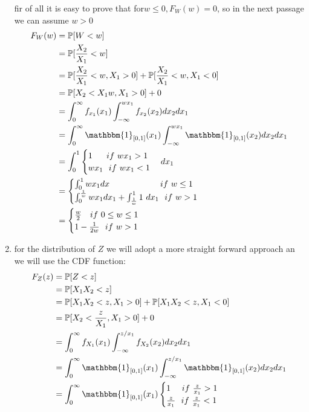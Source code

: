 \begin{ex}
\begin{enumerate}
		fir of all it is easy to prove that for$w\leq 0,F_W(w)=0$, so in the next passage we can assume $w>0$ 
		\[
		\begin{split}
		F_W(w)
		&=\p [W<w]\\
		&=\p[\frac{X_2}{X_1}<w]\\
		&=\p[\frac{X_2}{X_1}<w,X_1>0]+\p[\frac{X_2}{X_1}<w,X_1<0]\\
		&=\p[X_2<X_1w,X_1>0]+0\\
		&=\int_{0}^{\infty}f_{x_1}(x_1)\int_{-\infty}^{wx_1}f_{x_2}(x_2)dx_2dx_1\\
		&=\int_{0}^{\infty}\mathbbm{1}_{[0,1]}(x_1)\int_{-\infty}^{wx_1}\mathbbm{1}_{[0,1]}(x_2)dx_2dx_1\\
		&=\int_{0}^{1}	\begin{cases}
		1 \ \ \ \ \  if \ wx_1>1 \\
		wx_1 \ \  if \  wx_1<1
		\end{cases}dx_1\\
		&=\begin{cases}
		\int_0^1 wx_1 dx \ \ \ \ \ \ \ \ \ \ \ \ \ \ \ \ \ \ if \ w\leq 1\\
		\int_{0}^{\frac{1}{w}} wx_1dx_1+\int_{\frac{1}{w}}^{1} 1\ dx_1 \ \  if \ w>1
		\end{cases} \\
		&=\begin{cases}
		\frac{w}{2} \ \ \ if \ 0\leq w\leq 1\\
		1-\frac{1}{2w} \ \  if \ w>1
		\end{cases}
		\end{split}
		\]
		\item for the distribution of $Z$ we will adopt a more straight forward approach an we will use the CDF function:
		\[
		\begin{split}
		F_Z(z)
		&=\p [Z<z]\\
		&=\p[X_1X_2<z]\\
		&=\p[X_1X_2<z,X_1>0]+\p[X_1X_2<z,X_1<0]\\
		&=\p[X_2<\frac{z}{X_1},X_1>0]+0\\
		&=\int_{0}^{\infty}f_{X_1}(x_1)\int_{-\infty}^{z/x_1}f_{X_2}(x_2)dx_2 dx_1\\
		&=\int_{0}^{\infty}\mathbbm{1}_{[0,1]}(x_1)\int_{-\infty}^{z/x_1}\mathbbm{1}_{[0,1]}(x_2)dx_2 dx_1\\
		&=\int_{0}^{\infty} \mathbbm{1}_{[0,1]}(x_1)
		\begin{cases}
		1 \ \ \ \  if \ \frac{z}{x_1}>1 \\
		\frac{z}{x_1} \ \  if \  \frac{z}{x_1}<1

\end{cases}
\end{split}\]
\end{enumerate}
\end{ex}
